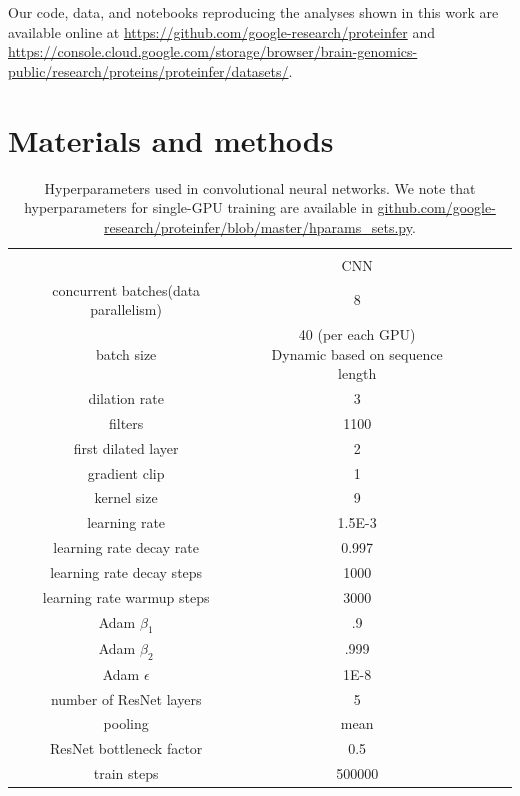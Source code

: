 Our code, data, and notebooks reproducing the analyses shown in this work are available online at \url{https://github.com/google-research/proteinfer} and \url{https://console.cloud.google.com/storage/browser/brain-genomics-public/research/proteins/proteinfer/datasets/}.



  \section*{Materials and methods}
  \begin{table}[htbp]
    \centering
    \def\arraystretch{1.1}
    \begin{tabular}{|c|c|c|c|c|}
    \hline
                               & \\
                               & CNN \\
    \Xhline{1pt}
    concurrent batches(data parallelism) & 8 \\
    \hline
    batch size                 & \shortstack{40 (per each GPU) \\ Dynamic based on sequence length} \\
    \hline
    dilation rate              & 3 \\
    \hline
    filters                    & 1100  \\
    \hline
    first dilated layer        & 2 \\
    \hline
    gradient clip              & 1 \\
    \hline
    kernel size                & 9 \\
    \hline
    learning rate              & 1.5E-3 \\
    \hline
    learning rate decay rate   & 0.997 \\
    \hline
    learning rate decay steps  & 1000 \\
    \hline
    learning rate warmup steps & 3000 \\
    \hline
    Adam $\beta_1$              & .9 \\
    \hline
    Adam $\beta_2$              & .999 \\
    \hline
    Adam $\epsilon$             & 1E-8 \\
    \hline
    number of ResNet layers     & 5 \\
    \hline
    pooling                     & mean \\
    \hline
    ResNet bottleneck factor    & 0.5 \\
    \hline
    train steps                 & 500000 \\
    \hline
    \end{tabular}
    \caption{Hyperparameters used in convolutional neural networks. We note that hyperparameters for single-GPU training are available in \url{github.com/google-research/proteinfer/blob/master/hparams_sets.py}.}
    \label{tab:nn_hparams}
    \end{table} 
 

